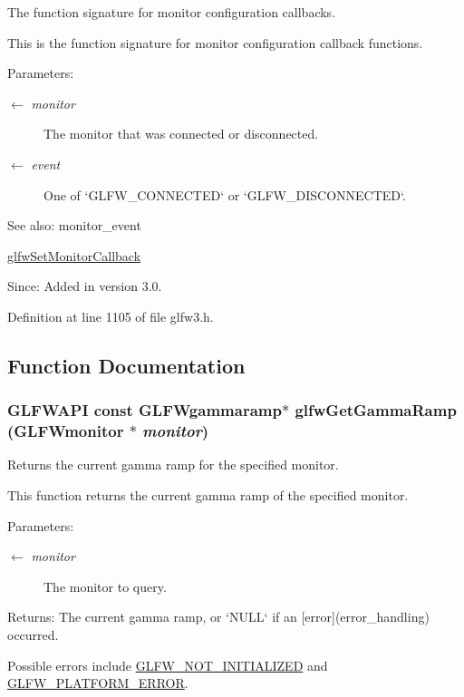 The function signature for monitor configuration callbacks. 

This is the function signature for monitor configuration callback functions.

\begin{Desc}
\item[Parameters:]
\begin{description}
\item[\mbox{$\leftarrow$} {\em monitor}]The monitor that was connected or disconnected. \item[\mbox{$\leftarrow$} {\em event}]One of `GLFW\_\-CONNECTED` or `GLFW\_\-DISCONNECTED`.\end{description}
\end{Desc}
\begin{Desc}
\item[See also:]monitor\_\-event 

\hyperlink{group__monitor_gcfa9978e57c73670577d530df23bf275}{glfwSetMonitorCallback}\end{Desc}
\begin{Desc}
\item[Since:]Added in version 3.0. \end{Desc}


Definition at line 1105 of file glfw3.h.

\subsection{Function Documentation}
\hypertarget{group__monitor_geeac9198f3c91b83440eed679441f76b}{
\subsubsection[glfwGetGammaRamp]{\setlength{\rightskip}{0pt plus 5cm}GLFWAPI const {\bf GLFWgammaramp}$\ast$ glfwGetGammaRamp ({\bf GLFWmonitor} $\ast$ {\em monitor})}}
\label{group__monitor_geeac9198f3c91b83440eed679441f76b}


Returns the current gamma ramp for the specified monitor. 

This function returns the current gamma ramp of the specified monitor.

\begin{Desc}
\item[Parameters:]
\begin{description}
\item[\mbox{$\leftarrow$} {\em monitor}]The monitor to query. \end{description}
\end{Desc}
\begin{Desc}
\item[Returns:]The current gamma ramp, or `NULL` if an \mbox{[}error\mbox{]}(error\_\-handling) occurred.\end{Desc}
Possible errors include \hyperlink{group__errors_g2374ee02c177f12e1fa76ff3ed15e14a}{GLFW\_\-NOT\_\-INITIALIZED} and \hyperlink{group__errors_gd44162d78100ea5e87cdd38426b8c7a1}{GLFW\_\-PLATFORM\_\-ERROR}.

